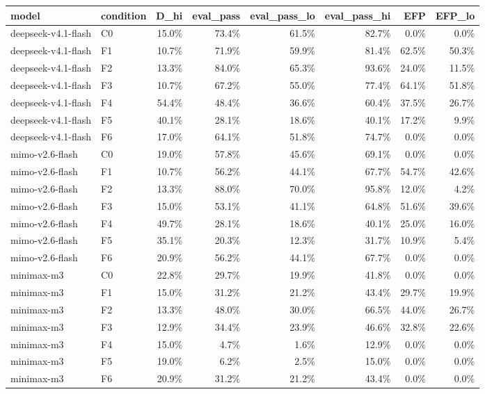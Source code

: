 \begin{tabular}{llrrrrrr}
\toprule
model & condition & D\_hi & eval\_pass & eval\_pass\_lo & eval\_pass\_hi & EFP & EFP\_lo \\
\midrule
deepseek-v4.1-flash & C0 & 15.0\% & 73.4\% & 61.5\% & 82.7\% & 0.0\% & 0.0\% \\
deepseek-v4.1-flash & F1 & 10.7\% & 71.9\% & 59.9\% & 81.4\% & 62.5\% & 50.3\% \\
deepseek-v4.1-flash & F2 & 13.3\% & 84.0\% & 65.3\% & 93.6\% & 24.0\% & 11.5\% \\
deepseek-v4.1-flash & F3 & 10.7\% & 67.2\% & 55.0\% & 77.4\% & 64.1\% & 51.8\% \\
deepseek-v4.1-flash & F4 & 54.4\% & 48.4\% & 36.6\% & 60.4\% & 37.5\% & 26.7\% \\
deepseek-v4.1-flash & F5 & 40.1\% & 28.1\% & 18.6\% & 40.1\% & 17.2\% & 9.9\% \\
deepseek-v4.1-flash & F6 & 17.0\% & 64.1\% & 51.8\% & 74.7\% & 0.0\% & 0.0\% \\
mimo-v2.6-flash & C0 & 19.0\% & 57.8\% & 45.6\% & 69.1\% & 0.0\% & 0.0\% \\
mimo-v2.6-flash & F1 & 10.7\% & 56.2\% & 44.1\% & 67.7\% & 54.7\% & 42.6\% \\
mimo-v2.6-flash & F2 & 13.3\% & 88.0\% & 70.0\% & 95.8\% & 12.0\% & 4.2\% \\
mimo-v2.6-flash & F3 & 15.0\% & 53.1\% & 41.1\% & 64.8\% & 51.6\% & 39.6\% \\
mimo-v2.6-flash & F4 & 49.7\% & 28.1\% & 18.6\% & 40.1\% & 25.0\% & 16.0\% \\
mimo-v2.6-flash & F5 & 35.1\% & 20.3\% & 12.3\% & 31.7\% & 10.9\% & 5.4\% \\
mimo-v2.6-flash & F6 & 20.9\% & 56.2\% & 44.1\% & 67.7\% & 0.0\% & 0.0\% \\
minimax-m3 & C0 & 22.8\% & 29.7\% & 19.9\% & 41.8\% & 0.0\% & 0.0\% \\
minimax-m3 & F1 & 15.0\% & 31.2\% & 21.2\% & 43.4\% & 29.7\% & 19.9\% \\
minimax-m3 & F2 & 13.3\% & 48.0\% & 30.0\% & 66.5\% & 44.0\% & 26.7\% \\
minimax-m3 & F3 & 12.9\% & 34.4\% & 23.9\% & 46.6\% & 32.8\% & 22.6\% \\
minimax-m3 & F4 & 15.0\% & 4.7\% & 1.6\% & 12.9\% & 0.0\% & 0.0\% \\
minimax-m3 & F5 & 19.0\% & 6.2\% & 2.5\% & 15.0\% & 0.0\% & 0.0\% \\
minimax-m3 & F6 & 20.9\% & 31.2\% & 21.2\% & 43.4\% & 0.0\% & 0.0\% \\

\end{tabular}
